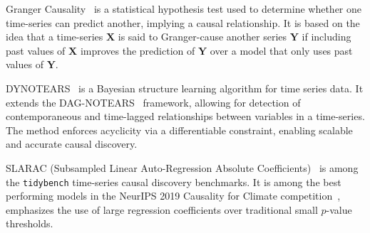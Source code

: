 Granger Causality~\citep{granger1969investigating} is a statistical hypothesis test used to determine whether one time-series can predict another, implying a causal relationship. It is based on the idea that a time-series $\mathbf{X}$ is said to Granger-cause another series 
$\mathbf{Y}$ if including past values of $\mathbf{X}$ improves the prediction of 
$\mathbf{Y}$ over a model that only uses past values of $\mathbf{Y}$.

DYNOTEARS~\citep{pamfil2020dynotears} is a Bayesian structure learning algorithm for time series data. It extends the DAG-NOTEARS~\citep{zheng2018dags} framework, allowing for detection of contemporaneous and time-lagged relationships between variables in a time-series. The method enforces acyclicity via a differentiable constraint, enabling scalable and accurate causal discovery. 

SLARAC (Subsampled Linear Auto-Regression Absolute Coefficients)~\citep{weichwald2020causal} is among the \texttt{tidybench} time-series causal discovery benchmarks. It is among the best performing models in the NeurIPS 2019 Causality for Climate competition~\citep{runge2020causality}, emphasizes the use of large regression coefficients over traditional small $p$-value thresholds. 




